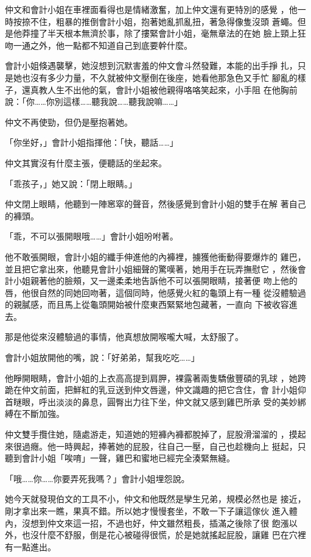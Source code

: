 仲文和會計小姐在車裡面看得也是情緒激奮，加上仲文還有更特別的感覺
，他一時按捺不住，粗暴的推倒會計小姐，抱著她亂抓亂扭，著急得像隻沒頭
蒼蠅。但是他莽撞了半天根本無濟於事，除了摟緊會計小姐，毫無章法的在她
臉上頸上狂吻一通之外，他一點都不知道自己到底要幹什麼。

會計小姐倏遇襲擊，她沒想到沉默害羞的仲文會斗然發難，本能的出手掙
扎，只是她也沒有多少力量，不久就被仲文壓倒在後座，她看他那急色又手忙
腳亂的樣子，還真教人生不出他的氣，會計小姐被他親得咯咯笑起來，小手阻
在他胸前說：「你……你別這樣……聽我說……聽我說嘛……」

仲文不再使勁，但仍是壓抱著她。

「你坐好，」會計小姐指揮他：「快，聽話……」

仲文其實沒有什麼主張，便聽話的坐起來。

「乖孩子，」她又說：「閉上眼睛。」

仲文閉上眼睛，他聽到一陣窸窣的聲音，然後感覺到會計小姐的雙手在解
著自己的褲頭。

「乖，不可以張開眼哦……」會計小姐吩咐著。

他不敢張開眼，會計小姐的纖手伸進他的內褲裡，擄獲他衝動得要爆炸的
雞巴，並且把它拿出來，他聽見會計小姐細聲的驚嘆著，她用手在玩弄撫慰它
，然後會計小姐親著他的臉頰，又一邊柔柔地告訴他不可以張開眼睛，接著便
吻上他的唇，他很自然的同她回吻著，這個同時，他感覺火紅的龜頭上有一種
從沒體驗過的親膩感，而且馬上從龜頭開始被什麼東西緊緊地包藏著，一直向
下被收容進去。

那是他從來沒體驗過的事情，他真想放開喉嚨大喊，太舒服了。

會計小姐放開他的嘴，說：「好弟弟，幫我吃吃……」

他睜開眼睛，會計小姐的上衣高高提到肩胛，裸露著兩隻驕傲豐碩的乳球
，她跨跪在仲文前面，把鮮紅的乳豆送到仲文唇邊，仲文識趣的把它含住，會
計小姐仰首瞇眼，呼出淡淡的鼻息，圓臀出力往下坐，仲文就又感到雞巴所承
受的美妙綁縛在不斷加強。

仲文雙手攬住她，隨處游走，知道她的短褲內褲都脫掉了，屁股滑溜溜的
，摸起來很過癮。他一時興起，捧著她的屁股，往自己一壓，自己也趁機向上
挺起，只聽到會計小姐「唉唷」一聲，雞巴和蜜地已經完全湊緊無縫。

「哦……你……你要弄死我嗎？」會計小姐埋怨說。

她今天就發現伯文的工具不小，仲文和他既然是孿生兄弟，規模必然也是
接近，剛才拿出來一瞧，果真不錯。所以她才慢慢套坐，不敢一下子讓這傢伙
進入體內，沒想到仲文來這一招，不過也好，仲文雖然粗長，插滿之後除了很
飽漲以外，也沒什麼不舒服，倒是花心被碰得很慌，於是她就搖起屁股，讓雞
巴在穴裡有一點進出。

